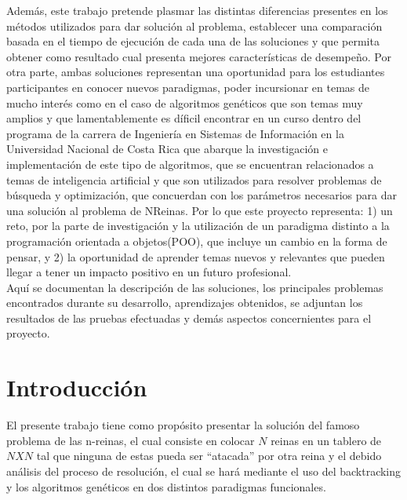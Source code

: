 \documentclass[12pt,a4paper]{article}
\begin{document}
 	Además, este trabajo pretende plasmar las distintas diferencias presentes en los métodos utilizados para dar solución al problema, establecer una comparación basada en el tiempo de ejecución de cada una de las soluciones y que permita obtener como resultado cual presenta mejores características de desempeño. Por otra parte, ambas soluciones representan una oportunidad para los estudiantes participantes en conocer nuevos paradigmas, poder incursionar en temas de mucho interés como en el caso de algoritmos genéticos que  son temas muy amplios y que lamentablemente es díficil encontrar en un curso dentro del programa de la carrera de Ingeniería en Sistemas de Información en la Universidad Nacional de Costa Rica que abarque la investigación e implementación de este tipo de algoritmos, que se encuentran relacionados a temas de inteligencia artificial y que son utilizados para resolver problemas de búsqueda y optimización, que concuerdan con los parámetros necesarios para dar una solución al problema de NReinas. Por lo que este proyecto representa: 1) un reto, por la parte de investigación y la utilización de un paradigma distinto a la programación orientada a objetos(POO), que incluye un cambio en la forma de pensar, y 2) la oportunidad de aprender temas nuevos y relevantes que pueden llegar a tener un impacto positivo en un futuro profesional. \\
 	
 	Aquí se documentan la descripción de las soluciones, los principales problemas encontrados durante su desarrollo, aprendizajes obtenidos, se adjuntan los resultados de las pruebas efectuadas y demás aspectos concernientes para el proyecto.
 	
\pagebreak
\section{Introducción}

	El presente trabajo tiene como propósito presentar la solución del famoso problema de las n-reinas, el cual consiste en colocar $N $ reinas en un tablero de $NXN $ tal que ninguna de estas pueda ser “atacada” por otra reina y el debido análisis del proceso de resolución, el cual se hará mediante el uso del backtracking y los algoritmos genéticos en dos distintos paradigmas funcionales.
\end{document}
